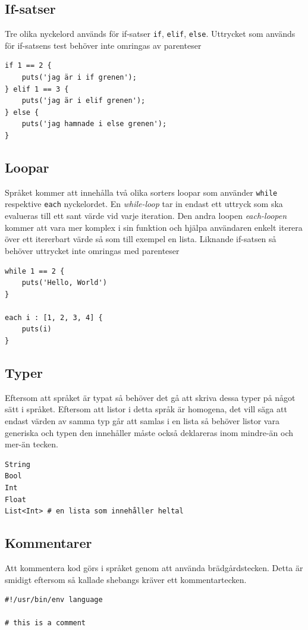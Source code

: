 \documentclass{TDP003mall}
\begin{document}
\subsection{If-satser}
Tre olika nyckelord används för if-satser \texttt{if}, \texttt{elif}, \texttt{else}. Uttrycket som används för if-satsens test behöver inte omringas av parenteser

\begin{verbatim}
if 1 == 2 {
    puts('jag är i if grenen');
} elif 1 == 3 {
    puts('jag är i elif grenen');
} else {
    puts('jag hamnade i else grenen');
}
\end{verbatim}

\subsection{Loopar}
Språket kommer att innehålla två olika sorters loopar som använder \texttt{while} respektive \texttt{each} nyckelordet. En \textit{while-loop} tar in endast ett uttryck som ska evalueras till ett sant värde vid varje iteration. Den andra loopen \textit{each-loopen} kommer att vara mer komplex i sin funktion och hjälpa användaren enkelt iterera över ett itererbart värde så som till exempel en lista. Liknande if-satsen så behöver uttrycket inte omringas med parenteser

\begin{verbatim}
while 1 == 2 {
    puts('Hello, World')
}

each i : [1, 2, 3, 4] {
    puts(i)
}
\end{verbatim}

\subsection{Typer}
Eftersom att språket är typat så behöver det gå att skriva dessa typer på något sätt i språket. Eftersom att listor i detta språk är homogena, det vill säga att endast värden av samma typ går att samlas i en lista så behöver listor vara generiska och typen den innehåller måste också deklareras inom mindre-än och mer-än tecken.
\begin{verbatim}
String
Bool
Int
Float
List<Int> # en lista som innehåller heltal
\end{verbatim}

\subsection{Kommentarer}
Att kommentera kod görs i språket genom att använda brädgårdstecken. Detta är smidigt eftersom så kallade shebangs kräver ett kommentartecken.
\begin{verbatim}
#!/usr/bin/env language

# this is a comment

\end{verbatim}
\end{document}
